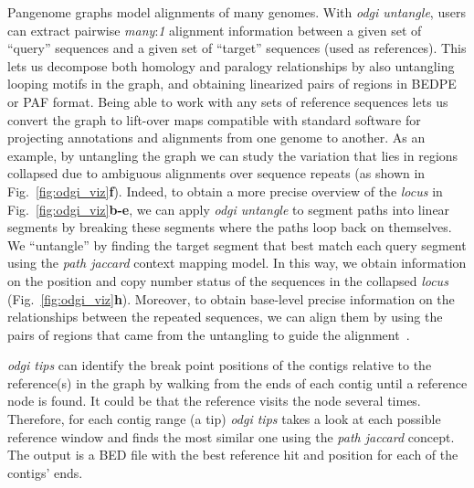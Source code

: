 \documentclass{bioinfo}
\begin{document}

Pangenome graphs model alignments of many genomes.
With \textit{odgi untangle}, users can extract pairwise \textit{many}:\textit{1} alignment information between a given set of ``query'' sequences and a given set of ``target'' sequences (used as references).
This lets us decompose both homology and paralogy relationships by also untangling looping motifs in the graph, and obtaining linearized pairs of regions in BEDPE or PAF format.
Being able to work with any sets of reference sequences lets us convert the graph to lift-over maps compatible with standard software for projecting annotations and alignments from one genome to another.
As an example, by untangling the graph we can study the variation that lies in regions collapsed due to ambiguous alignments over sequence repeats (as shown in Fig.~\ref{fig:odgi_viz}\textbf{f}).
Indeed, to obtain a more precise overview of the \textit{locus} in Fig.~\ref{fig:odgi_viz}\textbf{b-e},
we can apply \textit{odgi untangle} to segment paths into linear segments by breaking these segments where the paths loop back on themselves.
We ``untangle'' by finding the target segment that best match each query segment using the \textit{path jaccard} context mapping model.
In this way, we obtain information on the position and copy number status of the sequences in the collapsed \textit{locus} (Fig.~\ref{fig:odgi_viz}\textbf{h}).
Moreover, to obtain base-level precise information on the relationships between the repeated sequences, we can align them by using the pairs of regions that came from the untangling to guide the alignment~\citep{wfmash}.

\textit{odgi tips} can identify the break point positions of the contigs relative to the reference(s) in the graph by walking from the ends of each contig until a reference node is found. 
It could be that the reference visits the node several times. Therefore, for each contig range (a tip) \textit{odgi tips} takes a look at each possible reference window and finds the most similar one using the \textit{path jaccard} concept. 
The output is a BED file with the best reference hit and position for each of the contigs' ends. 
\end{document}
